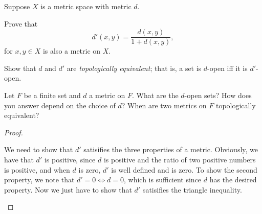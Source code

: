 \documentclass{assignment}
\begin{document}
\begin{question}[2]
  Suppose $X$ is a metric space with metric $d$.
\begin{qparts}
\item Prove that $$d'(x,y) = \frac{d(x,y)}{1 + d(x,y)}, $$for $x,y\in X$ is also a metric on $X$.
\item Show that $d$ and $d'$ are \emph{topologically equivalent}; that is, a set is $d$-open iff it is
$d'$-open.
\item Let $F$ be a finite set and $d$ a metric on $F$. What are the $d$-open sets? How does you answer
depend on the choice of $d$? When are two metrics on $F$ topologically equivalent?
\end{qparts}
\end{question}
\begin{proof}
  \begin{qparts}
    \item We need to show that $d'$ satisifies the three properties of a metric. Obviously, we have that
      $d'$ is positive, since $d$ is positive and the ratio of two positive numbers is positive, and 
      when $d$ is zero, $d'$ is well defined and is zero. To show the second property, we note that 
      $d' = 0 \iff d = 0$, which is sufficient since $d$ has the desired property. Now we just have
      to show that $d'$ satisifies the triangle inequality. \\


\end{qparts}
\end{proof}
\end{document}

